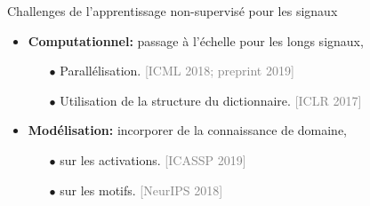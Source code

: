 \documentclass{beamer}
\def\keypoint#1{\hspace{0pt plus 1 filll}\textcolor{gray}{[{\color{linkcolor}#1}]}~}
\def\myitem{\hskip1ex{\color{linkcolor} $\blacktriangleright$}\hskip.3em}
\begin{document}
\begin{frame}{Challenges de l'apprentissage non-supervisé pour les signaux}


%
%
%
%


\begin{itemize}\itemsep1.5em
    \item \textbf{Computationnel:} passage à l'échelle pour les longs signaux,
    \begin{itemize}\itemsep.5em
        \item[$\bullet$] Parallélisation.%
                         \keypoint{ICML 2018; preprint 2019}
        \item[$\bullet$] Utilisation de la structure du dictionnaire.%
                         \keypoint{ICLR 2017}
    \end{itemize}

    \item \textbf{Modélisation:} incorporer de la connaissance de domaine,
    \begin{itemize}\itemsep.5em
        \item[$\bullet$] sur les activations.%
                         \keypoint{ICASSP 2019}
        \item[$\bullet$] sur les motifs.%
                         \keypoint{NeurIPS 2018}
    \end{itemize}


\end{itemize}
\end{frame}
\end{document}
